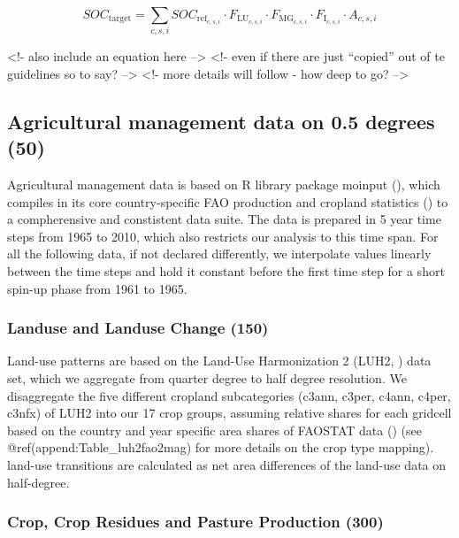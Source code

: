 \documentclass[gc, manuscript]{copernicus}
\begin{document}
\begin{equation}
SOC_{\text{target}} = \sum_{c,s,i} SOC_{\text{ref}_{c,s,i}} \cdot F_{\text{LU}_{c,s,i}} \cdot F_{\text{MG}_{c,s,i}} \cdot F_{\text{I}_{c,s,i}} \cdot A_{c,s,i}
\label{eq:tier1}
\end{equation}

\textless!- also include an equation here --\textgreater{} \textless!-
even if there are just ``copied'' out of te guidelines so to say?
--\textgreater{} \textless!- more details will follow - how deep to go?
--\textgreater{}

\hypertarget{sec:agrimanagement}{%
\subsection{Agricultural management data on 0.5 degrees
(50)}\label{sec:agrimanagement}}

Agricultural management data is based on R library package moinput
(\citep{bodirsky_in_prep}), which compiles in its core country-specific
FAO production and cropland statistics (\citep{FAOSTAT}) to a
compherensive and constistent data suite. The data is prepared in 5 year
time steps from 1965 to 2010, which also restricts our analysis to this
time span. For all the following data, if not declared differently, we
interpolate values linearly between the time steps and hold it constant
before the first time step for a short spin-up phase from 1961 to 1965.

\hypertarget{sec:landuse}{%
\subsubsection{Landuse and Landuse Change (150)}\label{sec:landuse}}

Land-use patterns are based on the Land-Use Harmonization 2 (LUH2,
\citep{LUH2}) data set, which we aggregate from quarter degree to half
degree resolution. We disaggregate the five different cropland
subcategories (c3ann, c3per, c4ann, c4per, c3nfx) of LUH2 into our 17
crop groups, assuming relative shares for each gridcell based on the
country and year specific area shares of FAOSTAT data (\citep{FAOSTAT})
(see @ref(append:Table\_luh2fao2mag) for more details on the crop type
mapping). land-use transitions are calculated as net area differences of
the land-use data on half-degree.

\subsubsection{Crop, Crop Residues and Pasture Production (300)}
\end{document}
